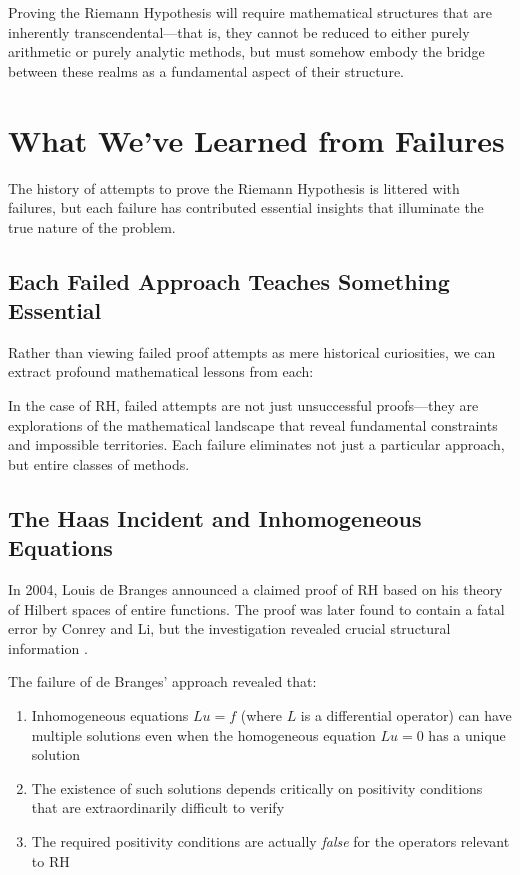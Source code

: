 \begin{conjecture}
Proving the Riemann Hypothesis will require mathematical structures that are inherently transcendental—that is, they cannot be reduced to either purely arithmetic or purely analytic methods, but must somehow embody the bridge between these realms as a fundamental aspect of their structure.
\end{conjecture}

\section{What We've Learned from Failures}
\label{sec:learning_from_failures}

The history of attempts to prove the Riemann Hypothesis is littered with failures, but each failure has contributed essential insights that illuminate the true nature of the problem.

\subsection{Each Failed Approach Teaches Something Essential}
\label{subsec:essential_lessons}

Rather than viewing failed proof attempts as mere historical curiosities, we can extract profound mathematical lessons from each:

\begin{insight}
In the case of RH, failed attempts are not just unsuccessful proofs—they are explorations of the mathematical landscape that reveal fundamental constraints and impossible territories. Each failure eliminates not just a particular approach, but entire classes of methods.
\end{insight}

\subsection{The Haas Incident and Inhomogeneous Equations}
\label{subsec:haas_incident}

In 2004, Louis de Branges announced a claimed proof of RH based on his theory of Hilbert spaces of entire functions. The proof was later found to contain a fatal error by Conrey and Li, but the investigation revealed crucial structural information \cite{conreyli2000}.

\begin{theorem}
The failure of de Branges' approach revealed that:
\begin{enumerate}
\item Inhomogeneous equations $Lu = f$ (where $L$ is a differential operator) can have multiple solutions even when the homogeneous equation $Lu = 0$ has a unique solution
\item The existence of such solutions depends critically on positivity conditions that are extraordinarily difficult to verify
\item The required positivity conditions are actually \emph{false} for the operators relevant to RH
\end{enumerate}
\end{theorem}

